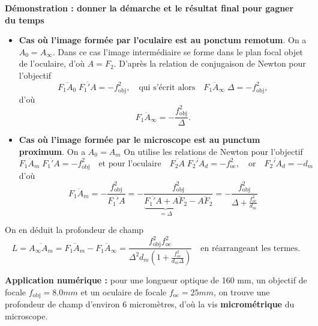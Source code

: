 \documentclass[11pt,a4paper]{report}
\begin{document}
\textbf{Démonstration : donner la démarche et le résultat final pour gagner du temps}
\begin{itemize}
	\item \textbf{Cas où l'image formée par l'oculaire est au ponctum remotum}. 
	On a $A_0 = A_\infty$. Dans ce cas l'image intermédiaire se forme dans le plan focal objet de 			l'oculaire, d'où $A = F_2$. D'après la relation de conjugaison de Newton pour l'objectif 
	\begin{equation}
		\overline{F_1A_0}\;\overline{F_1'A} = - f_\text{obj}^2,\quad\text{qui s'écrit alors}\quad
		\overline{F_1A_\infty}\;\Delta = - f_\text{obj}^2,	
	\end{equation}
	d'où
	\begin{equation}
		\overline{F_1A_\infty} = - \frac{f_\text{obj}^2}{\Delta}.
	\end{equation}
	\item \textbf{Cas où l'image formée par le microscope est au punctum proximum}. On a $A_0 = A_m$ 		On utilise les relations de Newton pour l'objectif
	\begin{equation}
		\overline{F_1A_m}\;\overline{F_1' A} = - f_\text{obj}^2		
		\quad\text{et pour l'oculaire}\quad
		\overline{F_2A}\;\overline{F_2' A_d} = - f_\text{oc}^2, 
		\quad\text{or}\quad \overline{F_2' A_d} = -d_m	
	\end{equation}
	d'où
	\begin{equation}
		\overline{F_1A_m} = - \frac{f_\text{obj}^2}{\overline{F_1'A}} 
		= - \frac{f_\text{obj}^2}{\underbrace{\overline{F_1'A} 
		+ \overline{AF_2}}_{= \Delta} - \overline{AF_2}}
		= - \frac{f_\text{obj}^2}{\Delta + \frac{f_\text{oc}^2}{d_m}}		
	\end{equation}
\end{itemize} 
 
On en déduit la profondeur de champ
\begin{equation}
	L = \overline{A_\infty A_m} = \overline{F_1 A_m} - \overline{F_1 A_\infty} =
	\frac{f_\text{obj}^2 f_\text{oc}^2}{\Delta^2 d_m \left(1 + 
	\frac{f_\text{oc}^2}{d_m \Delta} \right)}\quad\text{en réarrangeant les termes.}
\end{equation} 

\textbf{Application numérique :} pour une longueur optique de 160 mm, un objectif de focale $f_\text{obj} = 8.0 mm$ et un oculaire de focale $f_\text{oc} = 25 mm$, on trouve une profondeur de champ d'environ 6 micromètres, d'où la vis \textbf{micrométrique} du microscope.\\
\end{document}
